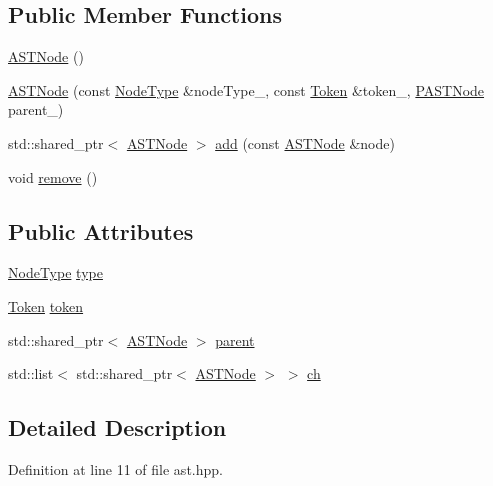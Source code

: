 \subsection*{Public Member Functions}
\begin{DoxyCompactItemize}
\item 
\hyperlink{struct_a_s_t_node_a1196ed4f19c0b62cdc42fe35946b91d2}{A\+S\+T\+Node} ()
\item 
\hyperlink{struct_a_s_t_node_a5992f969de0c4f71fb5094c6afebb63a}{A\+S\+T\+Node} (const \hyperlink{ast_8hpp_acac9cbaeea226ed297804c012dc12b16}{Node\+Type} \&node\+Type\+\_\+, const \hyperlink{struct_token}{Token} \&token\+\_\+, \hyperlink{ast_8hpp_ab65291a3ef1ea9ec8e3d396783b77e46}{P\+A\+S\+T\+Node} parent\+\_\+)
\item 
std\+::shared\+\_\+ptr$<$ \hyperlink{struct_a_s_t_node}{A\+S\+T\+Node} $>$ \hyperlink{struct_a_s_t_node_a95fc5e987ba87b6cadd7ab54a86f44ff}{add} (const \hyperlink{struct_a_s_t_node}{A\+S\+T\+Node} \&node)
\item 
void \hyperlink{struct_a_s_t_node_a5198921818aa511746856219cec0b637}{remove} ()
\end{DoxyCompactItemize}
\subsection*{Public Attributes}
\begin{DoxyCompactItemize}
\item 
\hyperlink{ast_8hpp_acac9cbaeea226ed297804c012dc12b16}{Node\+Type} \hyperlink{struct_a_s_t_node_a34086f3bc5af008f08f255c8ec57ba21}{type}
\item 
\hyperlink{struct_token}{Token} \hyperlink{struct_a_s_t_node_a99c0fc8e2fe4c99fbe85d0d195cfab57}{token}
\item 
std\+::shared\+\_\+ptr$<$ \hyperlink{struct_a_s_t_node}{A\+S\+T\+Node} $>$ \hyperlink{struct_a_s_t_node_a10d45a101e919c96194bae61c447ad01}{parent}
\item 
std\+::list$<$ std\+::shared\+\_\+ptr$<$ \hyperlink{struct_a_s_t_node}{A\+S\+T\+Node} $>$ $>$ \hyperlink{struct_a_s_t_node_a699a56f40c22c31468573943be9acf73}{ch}
\end{DoxyCompactItemize}


\subsection{Detailed Description}


Definition at line 11 of file ast.\+hpp.




